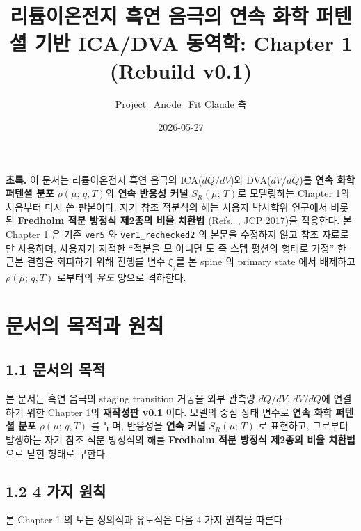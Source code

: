 \documentclass[11pt,a4paper]{article}
\title{\Large \textbf{리튬이온전지 흑연 음극의 연속 화학 퍼텐셜 기반 ICA/DVA 동역학:
       Chapter 1 (Rebuild v0.1)}}
\author{Project\_Anode\_Fit Claude 측}
\date{2026-05-27}
\newcommand{\mucont}{\mu}
\newcommand{\rhomu}{\rho(\mucont;\, q, T)}
\newcommand{\Sreact}{S_R(\mucont;\, T)}
\begin{document}
\maketitle

\begin{center}
\begin{minipage}{0.92\textwidth}
\textbf{초록.} 이 문서는 리튬이온전지 흑연 음극의 ICA($dQ/dV$)와 DVA($dV/dQ$)를
\textbf{연속 화학 퍼텐셜 분포} $\rhomu$와 \textbf{연속 반응성 커널} $\Sreact$로
모델링하는 Chapter 1의 처음부터 다시 쓴 판본이다. 자기 참조 적분식의 해는 사용자
박사학위 연구에서 비롯된 \textbf{Fredholm 적분 방정식 제2종의 비율 치환법}
(Refs.~\cite{lee2011propagator,son2013accurate}, JCP 2017)을 적용한다. 본 Chapter 1
은 기존 \texttt{ver5} 와 \texttt{ver1\_rechecked2} 의 본문을 수정하지 않고 참조
자료로만 사용하며, 사용자가 지적한 ``적분을 모 아니면 도 즉 스텝 펑션의 형태로
가정'' 한 근본 결함을 회피하기 위해 진행률 변수 $\xi_j$를 본 spine 의 primary
state 에서 배제하고 $\rhomu$ 로부터의 \emph{유도} 양으로 격하한다.
\end{minipage}
\end{center}

\tableofcontents
\newpage

\section{문서의 목적과 원칙}

\subsection*{1.1 문서의 목적}

본 문서는 흑연 음극의 staging transition 거동을 외부 관측량 $dQ/dV$, $dV/dQ$에
연결하기 위한 Chapter 1의 \textbf{재작성판 v0.1} 이다. 모델의 중심 상태 변수로
\textbf{연속 화학 퍼텐셜 분포} $\rhomu$ 를 두며, 반응성을 \textbf{연속 커널}
$\Sreact$ 로 표현하고, 그로부터 발생하는 자기 참조 적분 방정식의 해를
\textbf{Fredholm 적분 방정식 제2종의 비율 치환법} 으로 닫힌 형태로 구한다.

\subsection*{1.2 4 가지 원칙}

본 Chapter 1 의 모든 정의식과 유도식은 다음 4 가지 원칙을 따른다.
\end{document}
